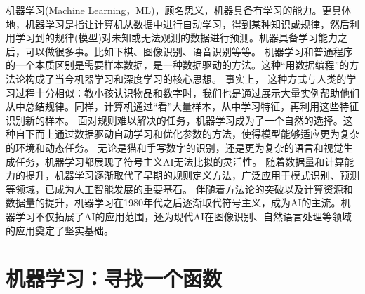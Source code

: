 机器学习(Machine Learning，ML)，顾名思义，机器具备有学习的能力。更具体地，机器学习是指让计算机从数据中进行自动学习，得到某种知识或规律，然后利用学习到的规律(模型)对未知或无法观测的数据进行预测。机器具备学习能力之后，可以做很多事。比如下棋、图像识别、语音识别等等。
机器学习和普通程序的一个本质区别是需要样本数据，是一种数据驱动的方法。这种“用数据编程”的方法论构成了当今机器学习和深度学习的核心思想。
事实上， 这种方式与人类的学习过程十分相似：教小孩认识物品和数字时，我们也是通过展示大量实例帮助他们从中总结规律。同样，计算机通过“看”大量样本，从中学习特征，再利用这些特征识别新的样本。
面对规则难以解决的任务，机器学习成为了一个自然的选择。这种自下而上通过数据驱动自动学习和优化参数的方法，使得模型能够适应更为复杂的环境和动态任务。
无论是猫和手写数字的识别，还是更为复杂的语言和视觉生成任务，机器学习都展现了符号主义AI无法比拟的灵活性。
随着数据量和计算能力的提升，机器学习逐渐取代了早期的规则定义方法，广泛应用于模式识别、预测等领域，已成为人工智能发展的重要基石。
伴随着方法论的突破以及计算资源和数据量的提升，机器学习在1980年代之后逐渐取代符号主义，成为AI的主流。机器学习不仅拓展了AI的应用范围，还为现代AI在图像识别、自然语言处理等领域的应用奠定了坚实基础。%
\section{机器学习：寻找一个函数}


